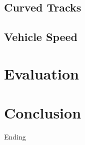 \documentclass[letterpaper, 10 pt, conference]{ieeeconf}  %
\begin{document}
\subsection{Curved Tracks}


\subsection{Vehicle Speed}

\section{Evaluation}




\section{Conclusion}

Ending 

\addtolength{\textheight}{-12cm}   %


\typeout{}



\end{document}
